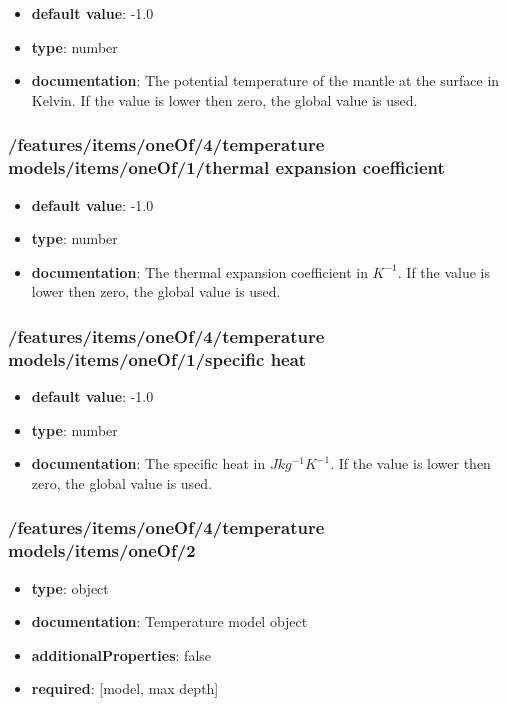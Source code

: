 \begin{itemize}\item {\bf default value}: -1.0
\item {\bf type}: number
\item {\bf documentation}: The potential temperature of the mantle at the surface in Kelvin. If the value is lower then zero, the global value is used.
\end{itemize}\subsubsection{/features/items/oneOf/4/temperature models/items/oneOf/1/thermal expansion coefficient}
\begin{itemize}\item {\bf default value}: -1.0
\item {\bf type}: number
\item {\bf documentation}: The thermal expansion coefficient in $K^{-1}$. If the value is lower then zero, the global value is used.
\end{itemize}\subsubsection{/features/items/oneOf/4/temperature models/items/oneOf/1/specific heat}
\begin{itemize}\item {\bf default value}: -1.0
\item {\bf type}: number
\item {\bf documentation}: The specific heat in $J kg^{-1} K^{-1}$. If the value is lower then zero, the global value is used.
\end{itemize}\subsubsection{/features/items/oneOf/4/temperature models/items/oneOf/2}
\begin{itemize}\item {\bf type}: object
\item {\bf documentation}: Temperature model object
\item {\bf additionalProperties}: false
\item {\bf required}: [model, max depth]\end{itemize}
